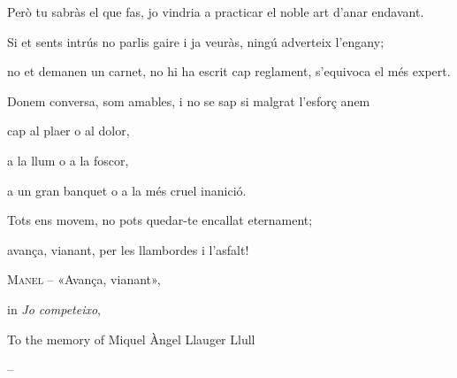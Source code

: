 \thispagestyle{empty}
\vspace*{\fill}
\noindent\hspace{0.0001\textwidth}\begin{minipage}{\textwidth}
Però tu sabràs el que fas, jo vindria a practicar el noble art d'anar endavant.

Si et sents intrús no parlis gaire i ja veuràs, ningú adverteix l'engany;

no et demanen un carnet, no hi ha escrit cap reglament, s'equivoca el més expert.

Donem conversa, som amables, i no se sap si malgrat l'esforç anem

cap al plaer o al dolor,

a la llum o a la foscor,

a un gran banquet o a la més cruel inanició.

\medskip

Tots ens movem, no pots quedar-te encallat eternament;

avança, vianant, per les llambordes i l'asfalt!

\bigskip

\raggedleft
\textsc{Manel} -- «Avança, vianant»,

in \textit{Jo competeixo}, 
\end{minipage}
\vspace*{\fill}

\clearpage
\thispagestyle{empty}
\mbox{}
\clearpage


\thispagestyle{empty}
\vspace*{\fill}
\begin{center}
\begin{minipage}{0.8\textwidth}
\centering
To the memory of Miquel Àngel Llauger Llull

\medskip

 -- 

\end{minipage}
\end{center}
\vspace*{\fill}

\clearpage
\thispagestyle{empty}
\mbox{}
\clearpage
